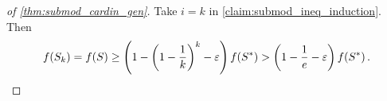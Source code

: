 \begin{proof}[of \cref{thm:submod_cardin_gen}]
    Take $i = k$ in \cref{claim:submod_ineq_induction}. Then 
    \begin{equation*}
        f \! \left( S_k \right) = f \! \left( S \right) \geq \left( 1 - \left( 1 - \frac{1}{k} \right)^k - \varepsilon \right)f \! \left( S^{\ast} \right) > \left( 1 - \frac{1}{e} - \varepsilon \right)f \! \left( S^{\ast} \right). 
    \end{equation*}
\end{proof}

\begin{comment}
\begin{theorem}
    Consider a non-negative, monotone, submodular function $f$ and an integer $k$. Let $S^*$ be the set of size $k$ that maximizes $f$ (i.e.\! the optimal solution). 
    Choose some $\varepsilon \in [0, 1 - \frac{1}{e})$.
    There exists some $\gamma \geq 0$ that $\varepsilon$ depends polynomially on such that if $S$ is the set constructed by iteratively choosing $k$ elements that maximize the marginal gain of the function value 
    to within a factor of $\lrp{1-\gamma}$ at each step, 
    then $\func{f}{S} \geq \lrp{1 - \frac{1}{e} - \varepsilon}\func{f}{S^*}$. 
    \label{thm:submod_cardin_gen}
\end{theorem}

\begin{claim}
    \begin{equation*}
        \f{S_{i+1}} - \f{S_i} \geq \frac{1-\gamma}{k} \lrp{\f{S_i \cup S^{\ast}} - \f{S_i}} 
        \quad \quad \textnormal{for each } i = 0, \ldots, k-1.
    \end{equation*}
    \label{claim:submod_ineq}
\end{claim}
\begin{proof} 
    Choose some $0 \leq i \leq k-1$. By definition of the greedy approach,
    \begin{align}
        \nonumber 
        \f{S_{i+1}} - \f{S_i} &\geq \lrp{1-\gamma} \lrp{\max_{s \in U} \lrp{\f{S_i \cup \lrc{s}} - \f{S_i}}}  \\
        \label{eq:submod_maximizer}                            
        &\geq \lrp{1-\gamma} \frac{1}{k} \sum_{j=1}^{k} \lrp{\f{S_i \cup \lrc{s_j^{\ast}}} - \f{S_i}}
    \end{align}
    where the second inequality comes from the fact that since $s$ is a maximizer, an average of the marginal gain from others elements in $U$ 
    (in this case specifically in $S^{\ast}$) must be at most the marginal value $s$ provides. 
    

\end{comment}
